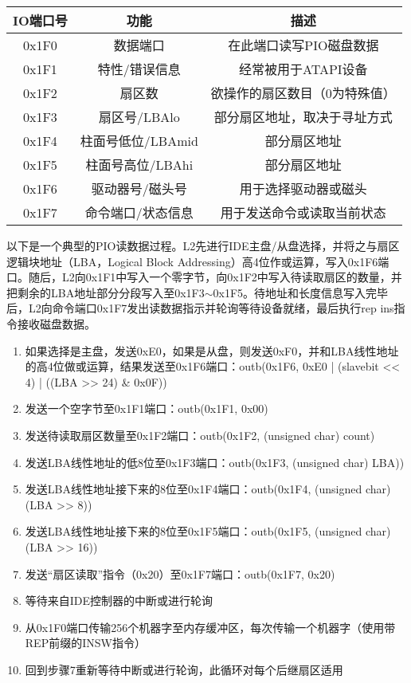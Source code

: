 \begin{table}[htpb]
\centering
\begin{tabular}{ccc}
\toprule
IO端口号	& 功能 & 描述\\
\midrule
0x1F0	& 数据端口	& 在此端口读写PIO磁盘数据\\
0x1F1	& 特性/错误信息	& 经常被用于ATAPI设备\\
0x1F2	& 扇区数	& 欲操作的扇区数目（0为特殊值）\\
0x1F3	& 扇区号/LBAlo	& 部分扇区地址，取决于寻址方式\\
0x1F4	& 柱面号低位/LBAmid	& 部分扇区地址\\
0x1F5	& 柱面号高位/LBAhi	& 部分扇区地址\\
0x1F6	& 驱动器号/磁头号	& 用于选择驱动器或磁头\\
0x1F7	& 命令端口/状态信息	& 用于发送命令或读取当前状态\\
\bottomrule
\end{tabular}
\end{table}

以下是一个典型的PIO读数据过程。L2先进行IDE主盘/从盘选择，并将之与扇区逻辑块地址（LBA，Logical Block Addressing）高4位作或运算，写入0x1F6端口。随后，L2向0x1F1中写入一个零字节，向0x1F2中写入待读取扇区的数量，并把剩余的LBA地址部分分段写入至0x1F3$\sim$0x1F5。待地址和长度信息写入完毕后，L2向命令端口0x1F7发出读数据指示并轮询等待设备就绪，最后执行rep ins指令接收磁盘数据。

\begin{enumerate}
\item 如果选择是主盘，发送0xE0，如果是从盘，则发送0xF0，并和LBA线性地址的高4位做或运算，结果发送至0x1F6端口：outb(0x1F6, 0xE0 | (slavebit << 4) | ((LBA >> 24) \& 0x0F))
\item 发送一个空字节至0x1F1端口：outb(0x1F1, 0x00)
\item 发送待读取扇区数量至0x1F2端口：outb(0x1F2, (unsigned char) count)
\item 发送LBA线性地址的低8位至0x1F3端口：outb(0x1F3, (unsigned char) LBA))
\item 发送LBA线性地址接下来的8位至0x1F4端口：outb(0x1F4, (unsigned char)(LBA >> 8))
\item 发送LBA线性地址接下来的8位至0x1F5端口：outb(0x1F5, (unsigned char)(LBA >> 16))
\item 发送``扇区读取''指令（0x20）至0x1F7端口：outb(0x1F7, 0x20)
\item 等待来自IDE控制器的中断或进行轮询
\item 从0x1F0端口传输256个机器字至内存缓冲区，每次传输一个机器字（使用带REP前缀的INSW指令）
\item 回到步骤7重新等待中断或进行轮询，此循环对每个后继扇区适用
\end{enumerate}

